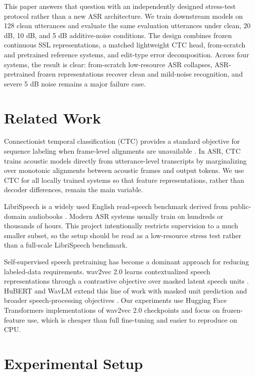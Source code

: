 \documentclass{article}
\begin{document}
This paper answers that question with an independently designed stress-test protocol rather than a new ASR architecture. We train downstream models on 128 clean utterances and evaluate the same evaluation utterances under clean, 20 dB, 10 dB, and 5 dB additive-noise conditions. The design combines frozen continuous SSL representations, a matched lightweight CTC head, from-scratch and pretrained reference systems, and edit-type error decomposition. Across four systems, the result is clear: from-scratch low-resource ASR collapses, ASR-pretrained frozen representations recover clean and mild-noise recognition, and severe 5 dB noise remains a major failure case.

\section{Related Work}
\label{sec:related}

Connectionist temporal classification (CTC) provides a standard objective for sequence labeling when frame-level alignments are unavailable \cite{graves2006ctc}. In ASR, CTC trains acoustic models directly from utterance-level transcripts by marginalizing over monotonic alignments between acoustic frames and output tokens. We use CTC for all locally trained systems so that feature representations, rather than decoder differences, remain the main variable.

LibriSpeech is a widely used English read-speech benchmark derived from public-domain audiobooks \cite{panayotov2015librispeech}. Modern ASR systems usually train on hundreds or thousands of hours. This project intentionally restricts supervision to a much smaller subset, so the setup should be read as a low-resource stress test rather than a full-scale LibriSpeech benchmark.

Self-supervised speech pretraining has become a dominant approach for reducing labeled-data requirements. wav2vec 2.0 learns contextualized speech representations through a contrastive objective over masked latent speech units \cite{baevski2020wav2vec2}. HuBERT and WavLM extend this line of work with masked unit prediction and broader speech-processing objectives \cite{hsu2021hubert,chen2022wavlm}. Our experiments use Hugging Face Transformers implementations \cite{wolf2020transformers} of wav2vec 2.0 checkpoints and focus on frozen-feature use, which is cheaper than full fine-tuning and easier to reproduce on CPU.

\section{Experimental Setup}
\label{sec:setup}
\end{document}
